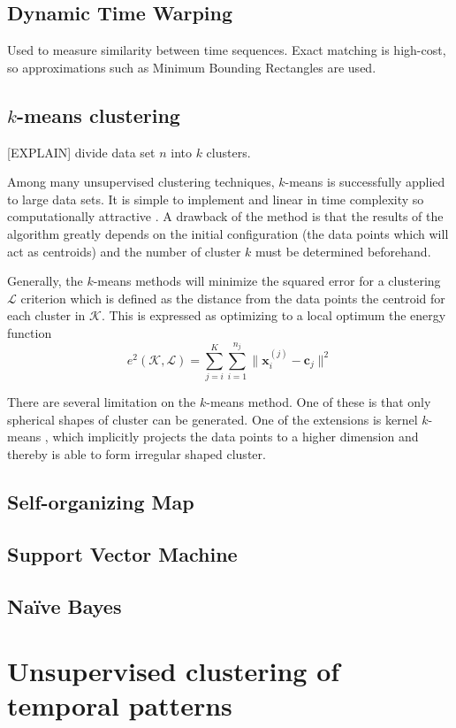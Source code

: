 \subsection{Dynamic Time Warping}
Used to measure similarity between time sequences. Exact matching is 
high-cost, so approximations such as Minimum Bounding Rectangles are used.

\subsection{$k$-means clustering}
[EXPLAIN] divide data set $n$ into $k$ clusters.

Among many unsupervised clustering techniques, $k$-means is successfully 
applied to large data sets. It is simple to implement and linear in time 
complexity so computationally attractive \cite{jain1999data}. A drawback of 
the method is that the results of the algorithm greatly depends on the initial 
configuration (the data points which will act as centroids) and the number of 
cluster $k$ must be determined beforehand.

Generally, the $k$-means methods will minimize the squared error for a 
clustering $\mathcal{L}$ criterion which is defined as the distance from the 
data points the centroid for each cluster in $\mathcal{K}$. This is expressed 
as optimizing to a local optimum the energy function
\begin{equation} \label{eq:k-means energy}
e^2(\mathcal{K},\mathcal{L}) = 
\sum_{j=i}^{K}\sum_{i=1}^{n_j}\|\mathbf{x}_i^{(j)} - 
\mathbf{c}_j\|^2
\end{equation}

There are several limitation on the $k$-means method. One of these is that 
only spherical shapes of cluster can be generated. One of the extensions is 
kernel $k$-means \cite{scholkopf1998nonlinear}, which implicitly projects the 
data points to a higher dimension and thereby is able to form irregular shaped 
cluster.

\subsection{Self-organizing Map}

\subsection{Support Vector Machine}

\subsection{Na\"{i}ve Bayes}

\section{Unsupervised clustering of temporal patterns}